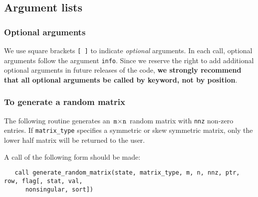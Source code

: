 
\subsection{Argument lists}

\subsubsection{Optional arguments}\label{Optional arguments}

We use square brackets {\tt [ ]} to indicate {\it optional} arguments.
In each
call, optional arguments follow the argument {\tt info}.  Since we
reserve the right to add additional optional arguments in future
releases of the code, {\bf we strongly recommend that all optional
arguments be called by keyword, not by position}.


\subsubsection{To generate a random matrix}

The following routine generates an $\texttt{m}\times \texttt{n}$ random matrix
with \texttt{nnz} non-zero entries. If \texttt{matrix\_type} specifies a
symmetric or skew symmetric matrix, only the lower half matrix will be returned
to the user.

\noindent
A call of the following form should be made:
\begin{verbatim}
   call generate_random_matrix(state, matrix_type, m, n, nnz, ptr, row, flag[, stat, val,
      nonsingular, sort])
\end{verbatim}

